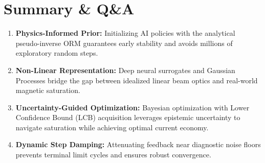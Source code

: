 \documentclass[11pt,a4paper]{article}
\begin{document}
\section{Summary \& Q\&A}

\begin{infobox}
\begin{enumerate}
    \item \textbf{Physics-Informed Prior:} Initializing AI policies with the analytical pseudo-inverse ORM guarantees early stability and avoids millions of exploratory random steps.
    \item \textbf{Non-Linear Representation:} Deep neural surrogates and Gaussian Processes bridge the gap between idealized linear beam optics and real-world magnetic saturation.
    \item \textbf{Uncertainty-Guided Optimization:} Bayesian optimization with Lower Confidence Bound (LCB) acquisition leverages epistemic uncertainty to navigate saturation while achieving optimal current economy.
    \item \textbf{Dynamic Step Damping:} Attenuating feedback near diagnostic noise floors prevents terminal limit cycles and ensures robust convergence.
\end{enumerate}
\end{infobox}
\end{document}
